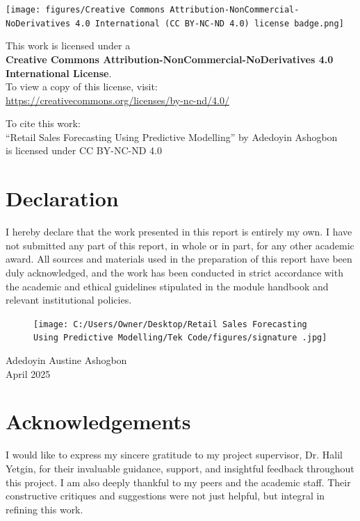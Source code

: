 \documentclass[12pt,a4paper]{report}
\begin{document}
\newpage
\thispagestyle{empty}
\begin{center}
\vspace*{3cm}
\texttt{[image: figures/Creative Commons Attribution-NonCommercial-NoDerivatives 4.0 International (CC BY-NC-ND 4.0) license badge.png]}
\vspace{1cm}

\large This work is licensed under a\\
\textbf{Creative Commons Attribution-NonCommercial-NoDerivatives 4.0 International License}.\\
\vspace{0.5em}
\small To view a copy of this license, visit:\\
\url{https://creativecommons.org/licenses/by-nc-nd/4.0/}

\vspace{1cm}
\normalsize
To cite this work:\\
``Retail Sales Forecasting Using Predictive Modelling'' by Adedoyin Ashogbon\\
is licensed under CC BY-NC-ND 4.0
\end{center}


\chapter*{Declaration}
I hereby declare that the work presented in this report is entirely my own. I have not submitted any part of this report, in whole or in part, for any other academic award. All sources and materials used in the preparation of this report have been duly acknowledged, and the work has been conducted in strict accordance with the academic and ethical guidelines stipulated in the module handbook and relevant institutional policies.

\vspace{1cm}
\begin{figure}[h]
\texttt{[image: C:/Users/Owner/Desktop/Retail Sales Forecasting Using Predictive Modelling/Tek Code/figures/signature .jpg]}
\end{figure}

\vspace{0.5cm}
Adedoyin Austine Ashogbon\\
April 2025

\chapter*{Acknowledgements}
I would like to express my sincere gratitude to my project supervisor, Dr. Halil Yetgin, for their invaluable guidance, support, and insightful feedback throughout this project. I am also deeply thankful to my peers and the academic staff. Their constructive critiques and suggestions were not just helpful, but integral in refining this work. 
\end{document}
